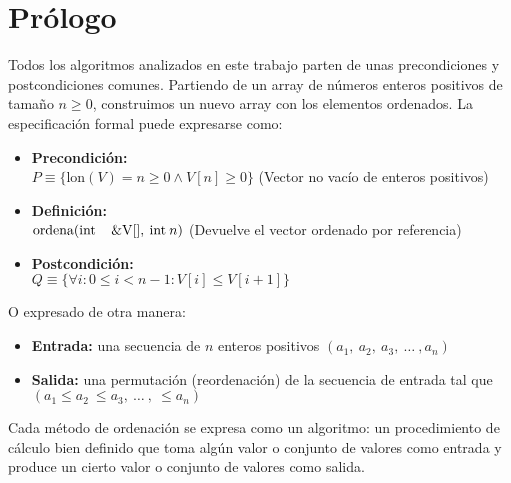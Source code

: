 \section{Prólogo}
Todos los algoritmos analizados en este trabajo parten de unas precondiciones y postcondiciones comunes. Partiendo de un array de números enteros positivos de tamaño $n \geq 0$, construimos un nuevo array con los elementos ordenados.  La especificación formal puede expresarse como:
\begin{itemize}
	\item \textbf{Precondición:}\\
		$P \equiv \{\mbox{lon}(V) = n \geq 0 \wedge V[n] \geq 0\}$ (Vector no vacío de enteros positivos)
	\item \textbf{Definición:}\\
		$\mbox{ordena}(\mbox{int \:\: \&V} [],\: \mbox{int} \:n)$ (Devuelve el 				vector ordenado por referencia)
	\item \textbf{Postcondición:}\\
		$Q \equiv \{\forall{i} : 0 \leq i < n - 1: V[i] \leq V[i + 1]\}$
\end{itemize}
O expresado de otra manera:\cite{CORMEN} 
\begin{itemize}
	\item \textbf{Entrada:} una secuencia de $n$ enteros positivos $(a_{1},\: a_{2},\: a_{3}, \:  \ldots\: 			,a_{n})$
	\item \textbf{Salida:} una permutación (reordenación) de la secuencia de entrada tal que $(a_{1} \leq 				a_{2}\:  \leq a_{3},\:  \ldots \:  ,\:\leq  a_{n})$
\end{itemize}

Cada método de ordenación se expresa como un algoritmo: un procedimiento de cálculo bien definido que toma algún valor o conjunto de valores como entrada y produce un cierto valor o conjunto de valores como salida. 
